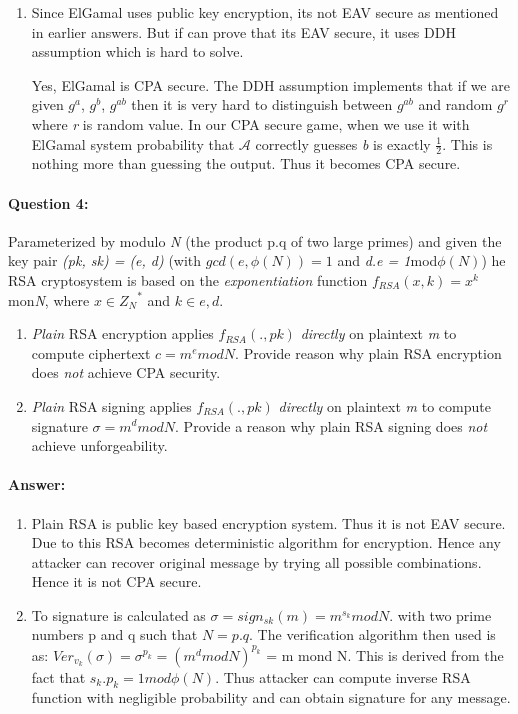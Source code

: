 \documentclass{article}
\begin{document}
\begin{enumerate}
            \item 
                Since ElGamal uses public key encryption, its not EAV secure as mentioned in earlier answers. But if can prove that its EAV secure, it uses DDH assumption which is hard to solve. 
                
                Yes, ElGamal is CPA secure. The DDH assumption implements that if we are given $g^a$, $g^b$, $g^{ab}$ then it is very hard to distinguish between $g^{ab}$ and random $g^r$ where \emph{r} is random value. In our CPA secure game, when we use it with ElGamal system probability that $\mathcal{A}$ correctly guesses \emph{b} is exactly $\frac{1}{2}$. This is nothing more than guessing the output. Thus it becomes CPA secure. \citep{elCPASec}
        \end{enumerate}
    
    \paragraph{Question 4:} Parameterized by modulo \emph{N} (the product p.q of two large primes) and given the key pair \emph{(pk, sk) = (e, d)} (with $gcd(e, \phi(N)) = 1$ and \emph{d.e = 1}mod$\phi(N)$) he RSA cryptosystem is based on the \emph{exponentiation} function $f_{RSA}(x,k)=x^k$mon\emph{N}, where $x\in {Z_N}^{*}$ and $k\in{e,d}$.
    \begin{enumerate}
        \item \emph{Plain} RSA encryption applies $f_{RSA}(.,pk)$ \emph{directly} on plaintext \emph{m} to compute ciphertext $c=m^e mod N$. Provide reason why plain RSA encryption does \emph{not} achieve CPA security.
        \item \emph{Plain} RSA signing applies $f_{RSA}(.,pk)$ \emph{directly} on plaintext \emph{m} to compute signature $\sigma=m^d mod N$. Provide a reason why plain RSA signing does \emph{not} achieve unforgeability.
    \end{enumerate}
    
    \paragraph{Answer:\newline}
        \begin{enumerate}
            \item Plain RSA is public key based encryption system. Thus it is not EAV secure. Due to this RSA becomes deterministic algorithm for encryption. Hence any attacker can recover original message by trying all possible combinations. Hence it is not CPA secure.
            \item To signature is calculated as $\sigma = sign_{sk}(m) = m^{s_k}mod N$. with two prime numbers p and q such that $N=p.q$. The verification algorithm then used is as: $Ver_{v_k}(\sigma) = \sigma^{p_k} = {(m^d mod N)}^{p_k}$ = m mond N. This is derived from the fact that  $s_k.p_k=1 mod \phi(N)$. \newline
            Thus attacker can compute inverse RSA function with negligible probability and can obtain signature for any message.
        \end{enumerate}
        
\end{document}
